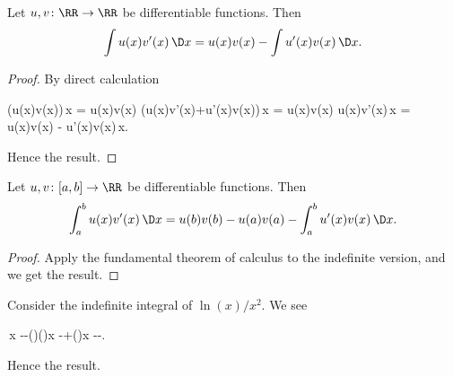 \begin{node}\label{calculus:integral-000C}%
\begin{node}\label{calculus:integral-000D}%
Let $u,v\colon\RR\to\RR$ be differentiable functions. Then
\[\int u(x)v'(x)\,\D x=u(x)v(x)-\int u'(x)v(x)\,\D x.\]
\begin{proof}
By direct calculation
\begin{calculation}
\int{}(u(x)v(x))\,\D x = u(x)v(x)
\int(u(x)v'(x)+u'(x)v(x))\,\D x = u(x)v(x)
\int u(x)v'(x)\,\D x = u(x)v(x) - \int u'(x)v(x)\,\D x.
\end{calculation}
Hence the result.
\end{proof}
\end{node}

\begin{node}\label{calculus:integral-000E}%
Let $u,v\colon[a,b]\to\RR$ be differentiable functions. Then
\[\int^{b}_{a} u(x)v'(x)\,\D x=u(b)v(b)-u(a)v(a)-\int^{b}_{a} u'(x)v(x)\,\D x.\]
\begin{proof}
Apply the fundamental theorem of calculus to the indefinite version, and
we get the result.
\end{proof}
\end{node}

\begin{example}\label{calculus:integral-000F}%
Consider the indefinite integral of $\ln(x)/x^{2}$. We see
\begin{calculation}
\int{}\,\D x
--\int\left(\right)\left(\right)\D x
-+\int\left(\right)\D x
--.
\end{calculation}
Hence the result.
\end{example}

\end{node} %


